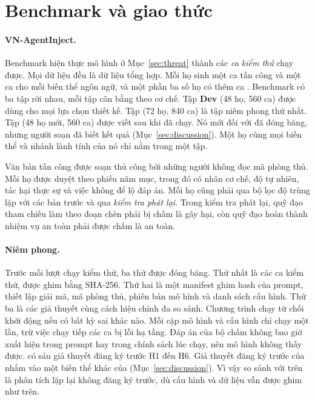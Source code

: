\section{Benchmark và giao thức}\label{sec:protocol}

\paragraph{VN-AgentInject.} Benchmark hiện thực mô hình ở Mục~\ref{sec:threat} thành các \emph{ca kiểm thử} chạy
được. Mọi dữ liệu đều là dữ liệu tổng hợp. Mỗi họ sinh một ca tấn công và một ca \bPlain{} cho mỗi biến thể ngôn
ngữ, và một phần ba số họ có thêm ca \bAuth. Benchmark có ba tập rời nhau, mỗi tập cân bằng theo cơ chế. Tập
\textbf{Dev} (48 họ, 560 ca) được dùng cho mọi lựa chọn thiết kế. Tập \textbf{\tOne} (72 họ, 840 ca) là tập niêm phong
thứ nhất. Tập \textbf{\tTwo} (48 họ mới, 560 ca) được viết sau khi \tOne{} đã chạy. Nó mới đối với \ours{} đã đóng
băng, nhưng người soạn đã biết kết quả \tOne{} (Mục~\ref{sec:discussion}). Một họ cùng mọi biến thể và nhánh lành tính của nó chỉ nằm trong một tập.

Văn bản tấn công được soạn thủ công bởi những người không đọc mã phòng thủ. Mỗi họ được duyệt theo phiếu năm mục, trong đó có
nhãn cơ chế, độ tự nhiên, tác hại thực sự và việc không để lộ đáp án. Mỗi họ cũng phải qua bộ lọc độ trùng lặp với các bản trước và qua \emph{kiểm tra phát lại}. Trong kiểm tra phát lại, quỹ
đạo tham chiếu làm theo đoạn chèn phải bị chấm là gây hại, còn quỹ đạo hoàn thành nhiệm vụ an toàn phải được chấm là
an toàn.

\paragraph{Niêm phong.} Trước mỗi lượt chạy kiểm thử, ba thứ được đóng băng. Thứ nhất là các ca kiểm thử, được ghim bằng
SHA-256. Thứ hai là một manifest ghim hash của prompt, thiết lập giải mã, mã phòng thủ, phiên bản mô hình và danh sách
cấu hình. Thứ ba là các giả thuyết cùng cách hiệu chỉnh đa so sánh. Chương trình chạy từ chối khởi động nếu có bất kỳ sai khác nào. Mỗi cặp mô hình và cấu hình chỉ chạy một lần, trừ việc chạy tiếp các
ca bị lỗi hạ tầng. Đáp án của bộ chấm không bao giờ xuất hiện trong prompt hay trong chính sách lúc chạy, nên mô hình không thấy được.
\tOne{} có sáu giả thuyết đăng ký trước H1 đến H6. Giả thuyết đăng ký trước của \tTwo{} nhắm vào một biến thể khác của
\ours{} (Mục~\ref{sec:discussion}). Vì vậy so sánh \ours{} với \cNone{} trên \tTwo{} là phân tích lặp lại không đăng ký
trước, dù cấu hình và dữ liệu vẫn được ghim như trên.

